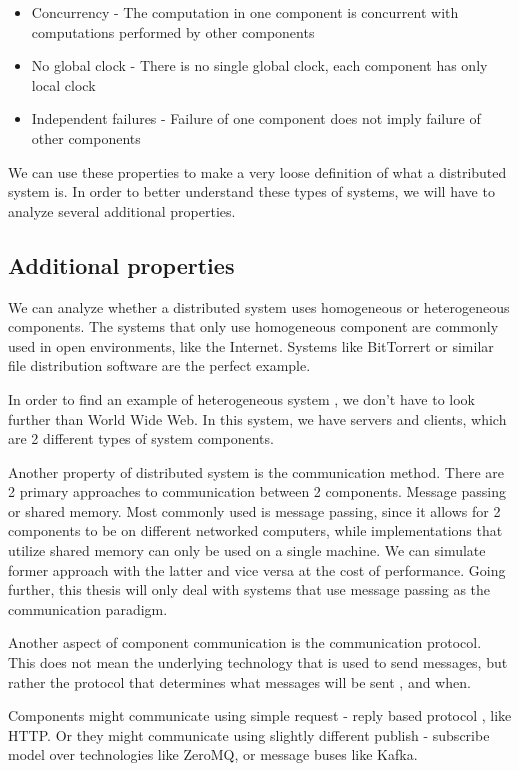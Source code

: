 \begin{itemize}
    \item Concurrency - The computation in one component is concurrent with computations performed by other components
    \item No global clock - There is no single global clock, each component has only local clock
    \item Independent failures - Failure of one component does not imply failure of other components
\end{itemize}

We can use these properties to make a very loose definition of what a distributed system is. In order to better understand these
types of systems, we will have to analyze several additional properties.

\subsection{Additional properties}

We can analyze whether a distributed system uses homogeneous or heterogeneous components.
The systems that only use homogeneous component are commonly used in open
environments, like the Internet. Systems like BitTorrert or similar file distribution software are the perfect example.

In order to find an example of heterogeneous system , we don't have to look further than World Wide Web. In this system,
we have servers and clients, which are 2 different types of system components.

Another property of distributed system is the communication method. There are 2 primary approaches to communication between 2 components. Message passing or shared
memory. Most commonly used is message passing, since it allows for 2 components to be on different networked computers, while implementations that utilize
shared memory can only be used on a single machine. We can simulate former approach with the latter and vice versa at the cost of performance.
Going further, this thesis will only deal with systems that use message passing as the communication paradigm.

Another aspect of component communication is the communication protocol. This does not mean the underlying technology that is used to send
messages, but rather the protocol that determines what messages will be sent , and when.

Components might communicate using simple request - reply based protocol , like HTTP. Or they might communicate using slightly different
publish - subscribe model over technologies like ZeroMQ, or message buses like Kafka.

